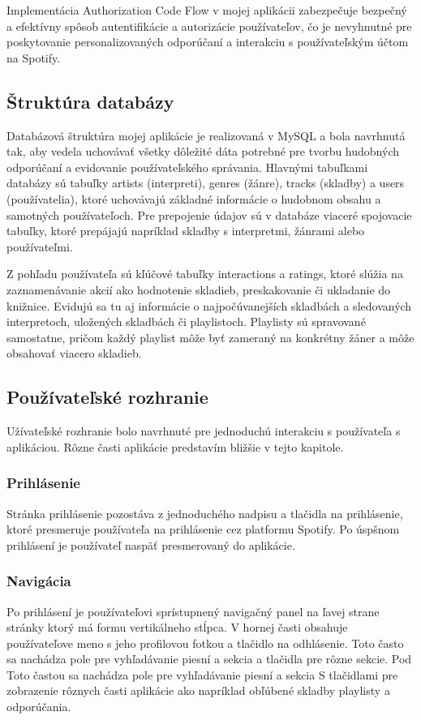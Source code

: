 Implementácia Authorization Code Flow v mojej aplikácii zabezpečuje bezpečný a efektívny spôsob autentifikácie a autorizácie používateľov, čo je nevyhnutné pre poskytovanie personalizovaných odporúčaní a interakciu s používateľským účtom na Spotify.

\subsection{Štruktúra databázy}
Databázová štruktúra mojej aplikácie je realizovaná v MySQL a bola navrhnutá tak, aby vedela uchovávať všetky dôležité dáta potrebné pre tvorbu hudobných odporúčaní a evidovanie používateľského správania. Hlavnými tabuľkami databázy sú tabuľky artists (interpreti), genres (žánre), tracks (skladby) a users (používatelia), ktoré uchovávajú základné informácie o hudobnom obsahu a samotných používateľoch. Pre prepojenie údajov sú v databáze viaceré spojovacie tabuľky, ktoré prepájajú napríklad skladby s interpretmi, žánrami alebo používateľmi.

Z pohľadu používateľa sú kľúčové tabuľky interactions a ratings, ktoré slúžia na zaznamenávanie akcií ako hodnotenie skladieb, preskakovanie či ukladanie do knižnice. Evidujú sa tu aj informácie o najpočúvanejších skladbách a sledovaných interpretoch, uložených skladbách či playlistoch. Playlisty sú spravované samostatne, pričom každý playlist môže byť zameraný na konkrétny žáner a môže obsahovať viacero skladieb.

\subsection{Používateľské rozhranie}
Užívateľské rozhranie bolo navrhnuté pre jednoduchú interakciu s používateľa s aplikáciou. Rôzne časti aplikácie predstavím bližšie v tejto kapitole.

\subsubsection{Prihlásenie}
Stránka prihlásenie pozostáva z jednoduchého nadpisu a tlačidla na prihlásenie, ktoré presmeruje používateľa na prihlásenie cez platformu Spotify. Po úspšnom prihlásení je používateľ naspäť presmerovaný do aplikácie.

\subsubsection{Navigácia}
Po prihlásení je používateľovi sprístupnený navigačný panel na ľavej strane stránky ktorý má formu vertikálneho stĺpca. V hornej časti obsahuje používateľove meno s jeho profilovou fotkou a tlačidlo na odhlásenie. Toto často sa nachádza pole pre vyhľadávanie piesní a sekcia a tlačidla pre rôzne sekcie. Pod Toto častou sa nachádza pole pre vyhľadávanie piesní a sekcia S tlačidlami pre zobrazenie rôznych časti aplikácie ako napríklad obľúbené skladby playlisty a odporúčania.

